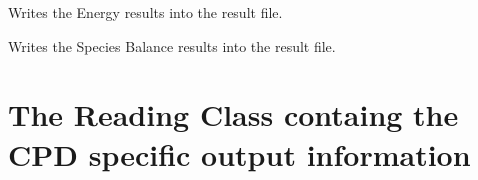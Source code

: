 \documentclass[letterpaper,10pt,english]{sphinxmanual}
\begin{document}
\begin{fulllineitems}
\begin{fulllineitems}
\end{fulllineitems}


\begin{fulllineitems}
\label{FGDVCClasses:Compos_and_Energy.FGDVC_SpeciesBalance._FGDVC_SpeciesBalance__writeEnergyResults}
Writes the Energy results into the result file.

\end{fulllineitems}


\begin{fulllineitems}
\label{FGDVCClasses:Compos_and_Energy.FGDVC_SpeciesBalance._FGDVC_SpeciesBalance__writeSpeciesResults}
Writes the Species Balance results into the result file.

\end{fulllineitems}


\end{fulllineitems}



\section{The Reading Class containg the CPD specific output information}
\label{FGDVCClasses:the-reading-class-containg-the-cpd-specific-output-information}
\end{document}
